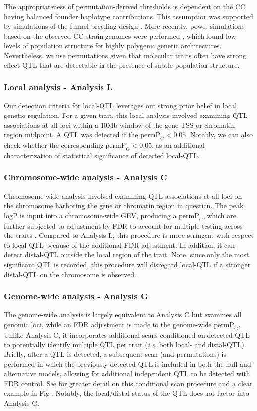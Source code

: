 \documentclass[10pt,letterpaper]{article}
\newcommand{\ie}{\emph{i.e.}\xspace}
\newcommand{\permpc}{\text{permP}_{\text{C}}}
\newcommand{\permpg}{\text{permP}_{\text{G}}}
\begin{document}
The appropriateness of permutation-derived thresholds \cite{Doerge1996} is dependent on the CC having balanced founder haplotype contributions. This assumption was supported by simulations of the funnel breeding design \cite{Valdar2006c}. More recently, power simulations based on the observed CC strain genomes were performed \cite{Keele2019}, which found low levels of population structure for highly polygenic genetic architectures. Nevertheless, we use permutations given that molecular traits often have strong effect QTL that are detectable in the presence of subtle population structure.

\subsubsection*{Local analysis - Analysis L} 
Our detection criteria for local-QTL leverages our strong prior belief in local genetic regulation. For a given trait, this local analysis involved examining QTL associations at all loci within a 10Mb window of the gene TSS or chromatin region midpoint. A QTL was detected if the $\text{permP}_{\text{C}} < 0.05$. Notably, we can also check whether the corresponding $\text{permP}_{\text{G}} < 0.05$, as an additional characterization of statistical significance of detected local-QTL.

\subsubsection*{Chromosome-wide analysis - Analysis C} 
Chromosome-wide analysis involved examining QTL associations at all loci on the chromosome harboring the gene or chromatin region in question. The peak logP is input into a chromosome-wide GEV, producing a $\permpc$, which are further subjected to adjustment by FDR to account for multiple testing across the traits \cite{Chesler2005}. 
Compared to Analysis L, this procedure is more stringent with respect to local-QTL because of the additional FDR adjustment. In addition, it can detect distal-QTL outside the local region of the trait. 
Note, since only the most significant QTL is recorded, this procedure will disregard local-QTL if a stronger distal-QTL on the chromosome is observed.

\subsubsection*{Genome-wide analysis - Analysis G} 
The genome-wide analysis is largely equivalent to Analysis C but examines all genomic loci, while an FDR adjustment is made to the genome-wide $\permpg$. Unlike Analysis C, it incorporates additional scans conditioned on detected QTL to potentially identify multiple QTL per trait (\ie both local- and distal-QTL). Briefly, after a QTL is detected, a subsequent scan (and permutations) is performed in which the previously detected QTL is included in both the null and alternative models, allowing for additional independent QTL to be detected with FDR control. See  for greater detail on this conditional scan procedure and a clear example in Fig . Notably, the local/distal status of the QTL does not factor into Analysis G.
\end{document}
